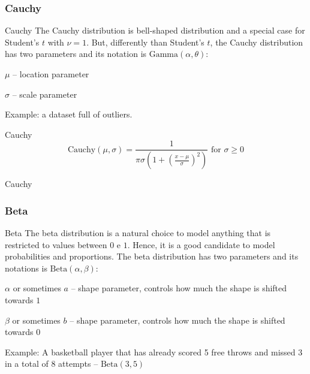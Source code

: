 \subsubsection*{Cauchy}
\begin{frame}[noframenumbering]{Cauchy}
	The Cauchy distribution is bell-shaped distribution and a special case for Student's $t$ with $\nu=1$.
	\vfill
	But, differently than Student's $t$, the Cauchy distribution has two parameters and its notation is
	$\text{Gamma}(\alpha, \theta)$:
	\begin{vfilleditems}
		\item $\mu$ -- location parameter
		\item $\sigma$ -- scale parameter
	\end{vfilleditems}
	\vfill
	Example: a dataset full of outliers.
\end{frame}

\begin{frame}[noframenumbering]{Cauchy}
	$$\text{Cauchy}(\mu, \sigma) = \frac{1}{\pi \sigma \left(1 + \left(\frac{x - \mu}{\sigma} \right)^2 \right)} \text{ for $\sigma \geq 0$}$$
\end{frame}

\begin{frame}[noframenumbering]{Cauchy}
	\centering
\end{frame}

\subsubsection*{Beta}
\begin{frame}[noframenumbering]{Beta}
	The beta distribution is a natural choice to model anything that is
	restricted to values between $0$ e $1$.
	Hence, it is a good candidate to model probabilities and proportions.
	\vfill
	The beta distribution has two parameters and its notations is
	$\text{Beta} (\alpha, \beta)$:
	\begin{vfilleditems}
		\item $\alpha$ or sometimes $a$ -- shape parameter,
		controls how much the shape is shifted towards $1$
		\item $\beta$ or sometimes $b$ -- shape parameter,
		controls how much the shape is shifted towards $0$
	\end{vfilleditems}
	\vfill
	Example: A basketball player that has already scored 5 free throws and
	missed 3 in a total of 8 attempts -- $\text{Beta}(3, 5)$
\end{frame}

